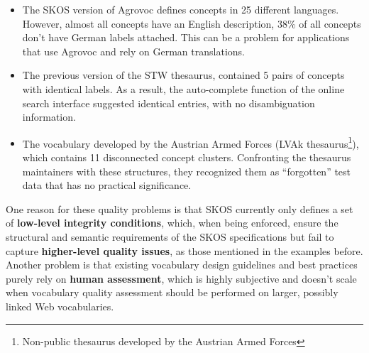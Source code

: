 \begin{itemize}

	\item The SKOS version of Agrovoc defines concepts in 25 different languages. However, almost all concepts have an English description, 38\% of all concepts don’t have German labels attached. This can be a problem for applications that use Agrovoc and rely on German translations.

	\item The previous version of the STW thesaurus, contained 5 pairs of concepts with identical labels. As a result, the auto-complete function of the online search interface suggested identical entries, with no disambiguation information.

	\item The vocabulary developed by the Austrian Armed Forces (LVAk thesaurus\footnote{Non-public thesaurus developed by the Austrian Armed Forces}), which contains 11 disconnected concept clusters. Confronting the thesaurus maintainers with these structures, they recognized them as “forgotten” test data that has no practical significance.


\end{itemize}


One reason for these quality problems is that SKOS currently only defines a set of \textbf{low-level integrity conditions}, which, when being enforced, ensure the structural and semantic requirements of the SKOS specifications but fail to capture \textbf{higher-level quality issues}, as those mentioned in the examples before. Another problem is that existing vocabulary design guidelines and best practices purely rely on \textbf{human assessment}, which is highly subjective and doesn’t scale when vocabulary quality assessment should be performed on larger, possibly linked Web vocabularies.

